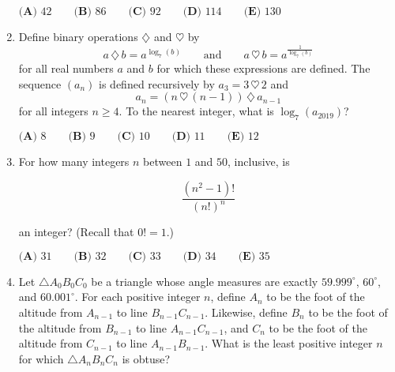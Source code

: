 \documentclass{article}
\begin{document}
\begin{enumerate}[label=\arabic*., itemsep=0.5em]
$\textbf{(A) } 42 \qquad \textbf{(B) }86 \qquad \textbf{(C) } 92 \qquad \textbf{(D) } 114 \qquad \textbf{(E) } 130$\par \vspace{0.5em}\item Define binary operations $\diamondsuit$ and $\heartsuit$ by 
\begin{equation*}
a \, \diamondsuit \, b = a^{\log_{7}(b)} \qquad \text{and} \qquad a  \, \heartsuit \, b = a^{\frac{1}{\log_{7}(b)}}
\end{equation*}
for all real numbers $a$ and $b$ for which these expressions are defined. The sequence $(a_n)$ is defined recursively by $a_3 = 3\, \heartsuit\, 2$ and 
\begin{equation*}
a_n = (n\, \heartsuit\, (n-1)) \,\diamondsuit\, a_{n-1}
\end{equation*}
for all integers $n \geq 4$. To the nearest integer, what is $\log_{7}(a_{2019})$?

$\textbf{(A) } 8 \qquad  \textbf{(B) } 9 \qquad \textbf{(C) } 10 \qquad \textbf{(D) } 11 \qquad \textbf{(E) } 12$\par \vspace{0.5em}\item For how many integers $n$ between $1$ and $50$, inclusive, is

\begin{equation*}
\frac{(n^2-1)!}{(n!)^n}
\end{equation*}

an integer? (Recall that $0! = 1$.)

$\textbf{(A) } 31 \qquad \textbf{(B) } 32 \qquad \textbf{(C) } 33 \qquad \textbf{(D) } 34 \qquad \textbf{(E) } 35$\par \vspace{0.5em}\item Let $\triangle A_0B_0C_0$ be a triangle whose angle measures are exactly $59.999^\circ$, $60^\circ$, and $60.001^\circ$. For each positive integer $n$, define $A_n$ to be the foot of the altitude from $A_{n-1}$ to line $B_{n-1}C_{n-1}$. Likewise, define $B_n$ to be the foot of the altitude from $B_{n-1}$ to line $A_{n-1}C_{n-1}$, and $C_n$ to be the foot of the altitude from $C_{n-1}$ to line $A_{n-1}B_{n-1}$. What is the least positive integer $n$ for which $\triangle A_nB_nC_n$ is obtuse?


\end{enumerate}
\end{document}
